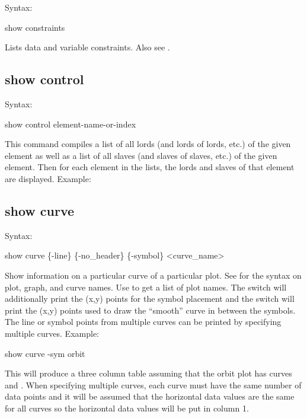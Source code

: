 {{{{{{{{Syntax:
\begin{example}
  show constraints
\end{example}

Lists data and variable constraints. Also see .


\subsection{show control}
\label{s:show.control}

Syntax:
\begin{example}
  show control {element-name-or-index}
\end{example}

This command compiles a list of all lords (and lords of lords, etc.) of the given element as well as
a list of all slaves (and slaves of slaves, etc.) of the given element. Then for each element in the
lists, the lords and slaves of that element are displayed. Example:


\subsection{show curve}
\label{s:show.curve}

Syntax:
\begin{example}
  show curve \{-line\} \{-no_header\} \{-symbol\} <curve_name>
\end{example}

Show information on a particular curve of a particular plot. See  for the syntax on
plot, graph, and curve names.  Use  to get a list of plot names. The 
switch will additionally print the (x,y) points for the symbol placement and the  switch
will print the (x,y) points used to draw the ``smooth'' curve in between the symbols. The line or
symbol points from multiple curves can be printed by specifying multiple curves. Example:
\begin{example}
  show curve -sym orbit
\end{example}
This will produce a three column table assuming that the orbit plot has curves  and
. When specifying multiple curves, each curve must have the same number of data
points and it will be assumed that the horizontal data values are the same for all curves so the
horizontal data values will be put in column 1.

}}}}}}}}
